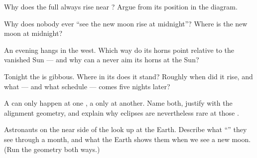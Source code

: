 \begin{exercise}[$\star$]\label{exo:g7:moon-phases:6}
Why does the full  always rise near ? Argue from its
position in the diagram.
\end{exercise}

\begin{exercise}[$\star$]\label{exo:g7:moon-phases:7}
Why does nobody ever ``see the new moon rise at midnight''?
Where is the new moon at midnight?
\end{exercise}

\begin{exercise}[$\star$]\label{exo:g7:moon-phases:8}
An evening  hangs in the west. Which way do its horns
point relative to the vanished Sun --- and why can a 
never aim its horns at the Sun?
\end{exercise}

\begin{exercise}[$\star\star$]\label{exo:g7:moon-phases:9}
Tonight the  is  gibbous. Where in its  does it
stand? Roughly when did it rise, and what  --- and what
schedule --- comes five nights later?
\end{exercise}

\begin{exercise}[$\star\star$]\label{exo:g7:moon-phases:10}
A  can only happen at one , a 
only at another. Name both, justify with the alignment
geometry, and explain why eclipses are nevertheless rare at
those .
\end{exercise}

\begin{exercise}[$\star\star$]\label{exo:g7:moon-phases:11}
Astronauts on the near side of the  look up at the Earth.
Describe what ``'' they see through a month, and
what  the Earth shows them when we see a new moon. (Run
the geometry both ways.)
\end{exercise}

